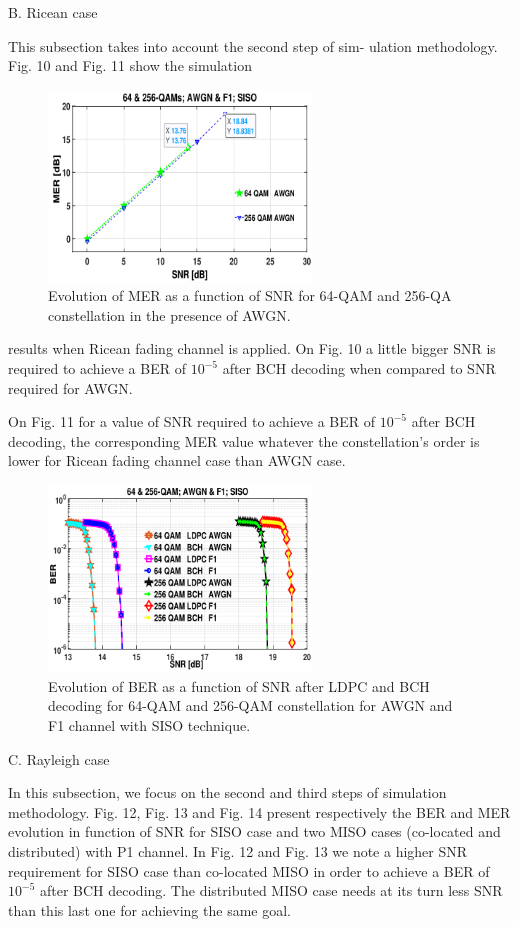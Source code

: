 \documentclass[10pt, conference]{IEEEtran}
\begin{document}
{\begin{adjustwidth}{0cm}{0cm}
    \textmd{ B. Ricean case}
\end{adjustwidth}

This subsection takes into account the second step of sim-
ulation methodology. Fig. 10 and Fig. 11 show the simulation

\begin{figure}[!htbp]
\centering
\includegraphics[width=7cm]{images/cap2.png}
\caption{
  \textup{{\small Evolution of MER as a function of SNR for 64-QAM and 256-QA constellation in the presence of AWGN.}}}
\end{figure}
  
\noindent results when Ricean fading channel is applied. On Fig. 10 a
little bigger SNR is required to achieve a BER of $10^{-5}$ after
BCH decoding when compared to SNR required for AWGN.

On Fig. 11 for a value of SNR required to achieve a BER
of $10^{-5}$ after BCH decoding, the corresponding MER value
whatever the constellation’s order is lower for Ricean fading
channel case than AWGN case.

\begin{figure}[!htbp]
\centering
\includegraphics[width=7cm]{images/cap3.png}
\caption{
 \normalsize{Evolution of BER as a function of SNR after LDPC and BCH
decoding for 64-QAM and 256-QAM constellation for AWGN and F1 channel
with SISO technique.}}
\end{figure}



\begin{adjustwidth}{0cm}{0cm}
    \textmd{ C. Rayleigh case}
\end{adjustwidth}


In this subsection, we focus on the second and third steps
of simulation methodology. Fig. 12, Fig. 13 and Fig. 14
present respectively the BER and MER evolution in function
of SNR for SISO case and two MISO cases (co-located and
distributed) with P1 channel. In Fig. 12 and Fig. 13 we note a
higher SNR requirement for SISO case than co-located MISO
in order to achieve a BER of $10^{-5}$ after BCH decoding. The
distributed MISO case needs at its turn less SNR than this last
one for achieving the same goal.
}
\end{document}
